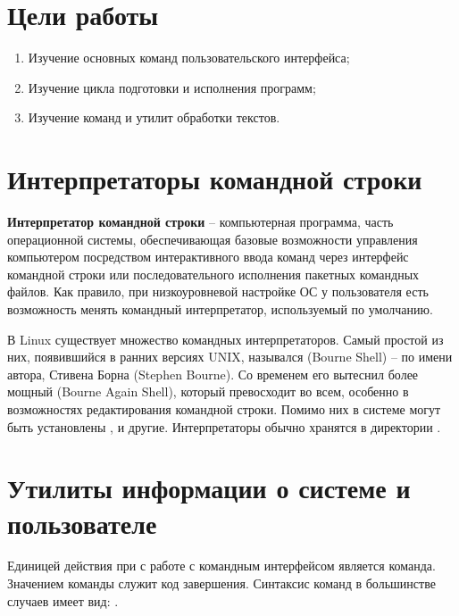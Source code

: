 





\tableofcontents
\newpage

\section{Цели работы}

\begin{enumerate}
	\item Изучение основных команд пользовательского интерфейса;
	\item Изучение цикла подготовки и исполнения программ;
	\item Изучение команд и утилит обработки текстов.
\end{enumerate}

\vspace{-1em}
\section{Интерпретаторы командной строки}

\textbf{Интерпретатор командной строки} -- компьютерная программа, часть операционной системы, обеспечивающая базовые возможности управления компьютером посредством интерактивного ввода команд через интерфейс командной строки или последовательного исполнения пакетных командных файлов. Как правило, при низкоуровневой настройке ОС у пользователя есть возможность менять командный интерпретатор, используемый по умолчанию.

В Linux существует множество командных интерпретаторов. Самый простой из них, появившийся в ранних версиях UNIX, назывался  (Bourne Shell) -- по имени автора, Стивена Борна (Stephen Bourne). Со временем его вытеснил более мощный  (Bourne Again Shell), который превосходит  во всем, особенно в возможностях редактирования командной строки. Помимо них в системе могут быть установлены ,  и другие. Интерпретаторы обычно хранятся в директории .

\vspace{-1em}
\section{Утилиты информации о системе и пользователе}

Единицей действия при с работе с командным интерфейсом является команда. Значением команды служит код завершения. Синтаксис команд в большинстве случаев имеет вид: .


